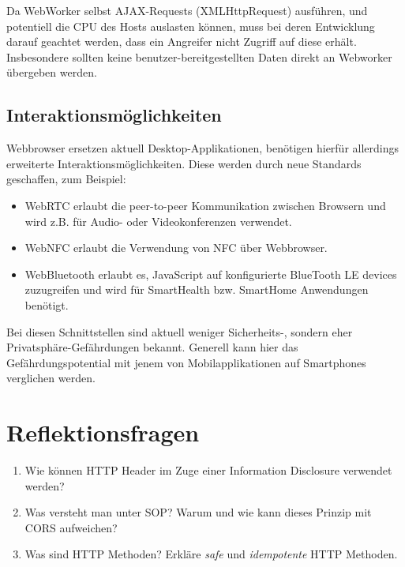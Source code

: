 Da WebWorker selbst AJAX-Requests (XMLHttpRequest) ausführen, und potentiell die CPU des Hosts auslasten können, muss bei deren Entwicklung darauf geachtet werden, dass ein Angreifer nicht Zugriff auf diese erhält. Insbesondere sollten keine benutzer-bereitgestellten Daten direkt an Webworker übergeben werden.

\subsection{Interaktionsmöglichkeiten}

Webbrowser ersetzen aktuell Desktop-Applikationen, benötigen hierfür allerdings erweiterte Interaktionsmöglichkeiten. Diese werden durch neue Standards geschaffen, zum Beispiel:

\begin{itemize}
	\item WebRTC erlaubt die peer-to-peer Kommunikation zwischen Browsern und wird z.B. für Audio- oder Videokonferenzen verwendet.
	\item WebNFC erlaubt die Verwendung von NFC über Webbrowser.
	\item WebBluetooth erlaubt es, JavaScript auf konfigurierte BlueTooth LE devices zuzugreifen und wird für SmartHealth bzw. SmartHome Anwendungen benötigt.
\end{itemize}

Bei diesen Schnittstellen sind aktuell weniger Sicherheits-, sondern eher Privatsphäre-Gefährdungen bekannt. Generell kann hier das Gefährdungspotential mit jenem von Mobilapplikationen auf Smartphones verglichen werden.

\section{Reflektionsfragen}

\begin{enumerate}
	\item Wie können HTTP Header im Zuge einer Information Disclosure verwendet werden?
	\item Was versteht man unter SOP? Warum und wie kann dieses Prinzip mit CORS aufweichen?
	\item Was sind HTTP Methoden? Erkläre \textit{safe} und \textit{idempotente} HTTP Methoden.
\end{enumerate}

